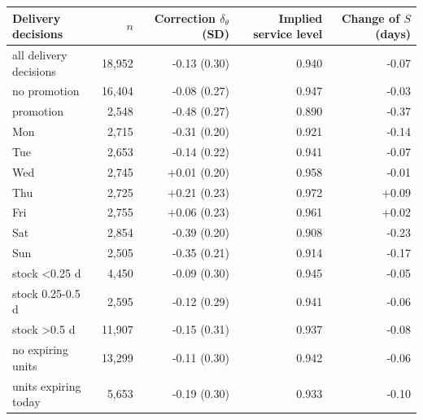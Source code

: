 \begin{tabular}{lrrrr}
\toprule
Delivery decisions & $n$ & Correction $\delta_\theta$ (SD) & Implied service level & Change of $S$ (days) \\
\midrule
all delivery decisions & 18,952 & -0.13 (0.30) & 0.940 & -0.07 \\
no promotion & 16,404 & -0.08 (0.27) & 0.947 & -0.03 \\
promotion & 2,548 & -0.48 (0.27) & 0.890 & -0.37 \\
Mon & 2,715 & -0.31 (0.20) & 0.921 & -0.14 \\
Tue & 2,653 & -0.14 (0.22) & 0.941 & -0.07 \\
Wed & 2,745 & +0.01 (0.20) & 0.958 & -0.01 \\
Thu & 2,725 & +0.21 (0.23) & 0.972 & +0.09 \\
Fri & 2,755 & +0.06 (0.23) & 0.961 & +0.02 \\
Sat & 2,854 & -0.39 (0.20) & 0.908 & -0.23 \\
Sun & 2,505 & -0.35 (0.21) & 0.914 & -0.17 \\
stock <0.25 d & 4,450 & -0.09 (0.30) & 0.945 & -0.05 \\
stock 0.25-0.5 d & 2,595 & -0.12 (0.29) & 0.941 & -0.06 \\
stock >0.5 d & 11,907 & -0.15 (0.31) & 0.937 & -0.08 \\
no expiring units & 13,299 & -0.11 (0.30) & 0.942 & -0.06 \\
units expiring today & 5,653 & -0.19 (0.30) & 0.933 & -0.10 \\
\bottomrule
\end{tabular}
